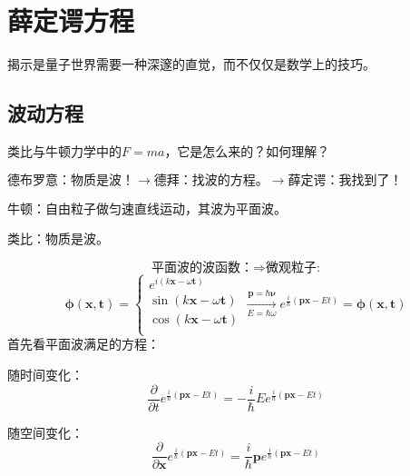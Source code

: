 \chapter{薛定谔方程}
\begin{center}
    \textcolor[RGB]{255, 0, 0}{\faHeart}揭示是量子世界需要一种深邃的直觉，而不仅仅是数学上的技巧。\textcolor[RGB]{255, 0, 0}{\faHeart}
\end{center}
\vspace{-5pt}
\begin{center}
\end{center}

\section{波动方程}
类比与牛顿力学中的$F=ma$，它是怎么来的？如何理解？

$\text{德布罗意：物质是波！} \longrightarrow \text{德拜：找波的方程。} \longrightarrow \text{薛定谔：我找到了！}$

牛顿：自由粒子做匀速直线运动，其波为平面波。

类比：物质是波。

$$\text{平面波的波函数：}\Longrightarrow \text{微观粒子:}$$
$$
\boldsymbol{\phi }(\boldsymbol{x,t})=\left\{ \begin{array}{l}
  e^{i\left( k\boldsymbol{x}-\omega \boldsymbol{t} \right)}\\
  \sin \left( k\boldsymbol{x}-\omega \boldsymbol{t} \right)\\
  \cos \left( k\boldsymbol{x}-\omega \boldsymbol{t} \right)\\
\end{array} \right. \xrightarrow[E=\hbar \omega]{\boldsymbol{p}=\hbar \boldsymbol{\nu }}e^{\frac{i}{\hbar }\left( \boldsymbol{px}-Et \right)}=\boldsymbol{\phi} \left( \boldsymbol{x,t} \right) 
$$
首先看平面波满足的方程：

随时间变化：
\begin{equation}\label{inter}
    \frac{\partial}{\partial t}e^{\frac{i}{\hbar}(\boldsymbol{px}-Et)}=-\frac{i}{\hbar}Ee^{\frac{i}{\hbar}(\boldsymbol{px}-Et)}
\end{equation}

随空间变化：
\begin{equation}\label{inter}
    \frac{\partial}{\partial \boldsymbol{x}}e^{\frac{i}{\hbar}(\boldsymbol{px}-Et)}=\frac{i}{\hbar}\boldsymbol{p}e^{\frac{i}{\hbar}(\boldsymbol{px}-Et)}
\end{equation}

